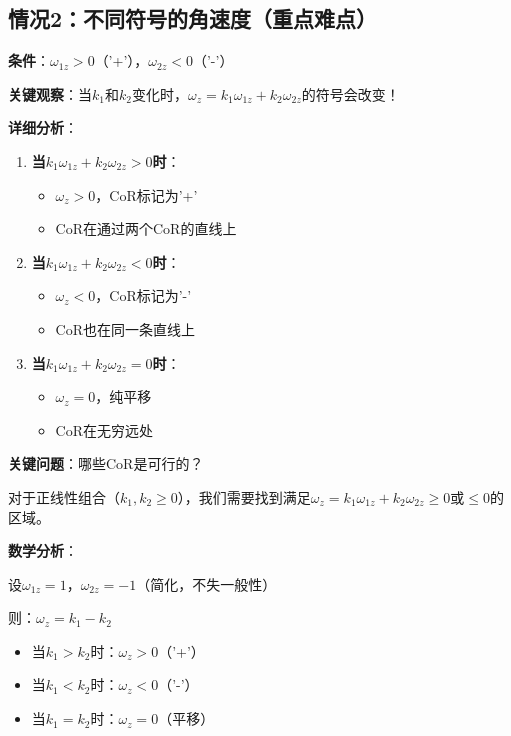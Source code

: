 \documentclass[12pt,a4paper]{article}
\begin{document}
\subsection{情况2：不同符号的角速度（重点难点）}

\textbf{条件}：$\omega_{1z} > 0$（'+'），$\omega_{2z} < 0$（'-'）

\textbf{关键观察}：当$k_1$和$k_2$变化时，$\omega_z = k_1 \omega_{1z} + k_2 \omega_{2z}$的符号会改变！

\textbf{详细分析}：

\begin{enumerate}
\item \textbf{当$k_1 \omega_{1z} + k_2 \omega_{2z} > 0$时}：
  \begin{itemize}
  \item $\omega_z > 0$，CoR标记为'+'
  \item CoR在通过两个CoR的直线上
  \end{itemize}

\item \textbf{当$k_1 \omega_{1z} + k_2 \omega_{2z} < 0$时}：
  \begin{itemize}
  \item $\omega_z < 0$，CoR标记为'-'
  \item CoR也在同一条直线上
  \end{itemize}

\item \textbf{当$k_1 \omega_{1z} + k_2 \omega_{2z} = 0$时}：
  \begin{itemize}
  \item $\omega_z = 0$，纯平移
  \item CoR在无穷远处
  \end{itemize}
\end{enumerate}

\textbf{关键问题}：哪些CoR是可行的？

对于正线性组合（$k_1, k_2 \geq 0$），我们需要找到满足$\omega_z = k_1 \omega_{1z} + k_2 \omega_{2z} \geq 0$或$\leq 0$的区域。

\textbf{数学分析}：

设$\omega_{1z} = 1$，$\omega_{2z} = -1$（简化，不失一般性）

则：$\omega_z = k_1 - k_2$

\begin{itemize}
\item 当$k_1 > k_2$时：$\omega_z > 0$（'+'）
\item 当$k_1 < k_2$时：$\omega_z < 0$（'-'）
\item 当$k_1 = k_2$时：$\omega_z = 0$（平移）
\end{itemize}
\end{document}
